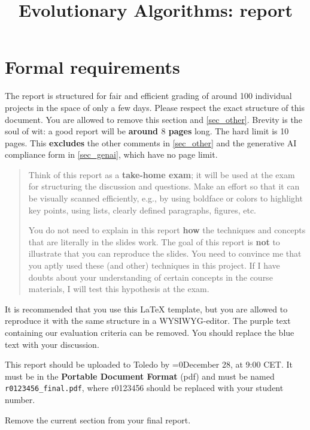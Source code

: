 \documentclass[a4paper,10pt]{article}
\title{\vspace{-2cm}Evolutionary Algorithms: \switch{Final}{Retake} report}
\author{\ReplaceMe{Your Name (r0123456)}}
\def\retake{0}
\newcommand{\switch}[2]{\ifnum\retake=0{#1}\else{#2}\fi}
\newcommand{\thisyear}{\the\year}
\newcommand{\deadlineCode}{\switch{December 28, \thisyear{} at 9:00 CET}{August 4, \thisyear{} at 9:00 CET}}
\newcommand{\deadlineReport}{\deadlineCode}
\newcommand{\RemoveMe}[1]{{\color{purple}#1}}
\begin{document}
\selectfont{}

\maketitle

\RemoveMe{
\section*{Formal requirements} \label{sec_this}

The report is structured for fair and efficient grading of around 100 individual projects in the space of only a few days. Please respect the exact structure of this document. You are allowed to remove this section and \ref{sec_other}. Brevity is the soul of wit: a good report will be \textbf{around $8$ pages} long. The hard limit is 10 pages. 
This \textbf{excludes} the other comments in \ref{sec_other} and the generative AI compliance form in \ref{sec_genai}, which have no page limit.

\begin{quote}
Think of this report as a \textbf{take-home exam}; it will be used at the exam for structuring the discussion and questions. Make an effort so that it can be visually scanned efficiently, e.g., by using boldface or colors to highlight key points, using lists, clearly defined paragraphs, figures, etc.

You do not need to explain in this report \textbf{how} the techniques and concepts that are literally in the slides work. The goal of this report is \textbf{not} to illustrate that you can reproduce the slides. You need to convince me that you aptly used these (and other) techniques in this project. If I have doubts about your understanding of certain concepts in the course materials, I will test this hypothesis at the exam.
\end{quote}

It is recommended that you use this \LaTeX{} template, but you are allowed to reproduce it with the same structure in a WYSIWYG-editor. The purple text containing our evaluation criteria can be removed. You should replace the blue text with your discussion.

This report should be uploaded to Toledo by \deadlineReport. It must be in the \textbf{Portable Document Format} (pdf) and must be named \texttt{r0123456\_final.pdf}, where r0123456 should be replaced with your student number.

Remove the current section from your final report.
}
\end{document}
